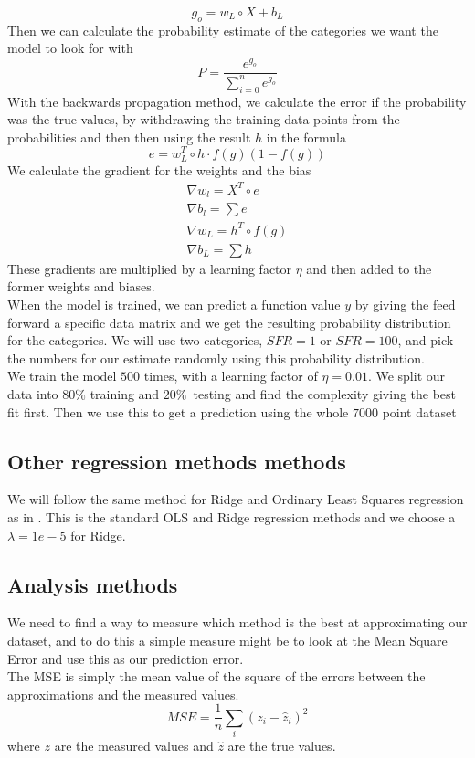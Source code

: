 \documentclass[11pt, A4paper, english]{article}
\begin{document}
\begin{multicols}{2}
				\begin{equation}
g_o = w_L \circ X + b_L
				\end{equation}
Then we can calculate the probability estimate of the categories we want the model to look for with
				\begin{equation}
P = \frac{e^{g_o}}{\sum_{i = 0}^{n} e^{g_o}}
				\end{equation}
With the backwards propagation method, we calculate the error if the probability was the true values, by withdrawing the training data points from the probabilities and then then using the result $h$ in the formula
				\begin{equation}
e = w_L^T \circ h \cdot f(g) (1 - f(g))
				\end{equation}
We calculate the gradient for the weights and the bias
				\begin{gather}
\nabla w_l = X^T \circ e \\
\nabla b_l = \sum e \\
\nabla w_L = h^T \circ f(g) \\
\nabla b_L = \sum h
				\end{gather}
These gradients are multiplied by a learning factor $\eta$ and then added to the former weights and biases. \\
When the model is trained, we can predict a function value $y$ by giving the feed forward a specific data matrix and we get the resulting probability distribution for the categories. We will use two categories, $SFR = 1$ or $SFR = 100$, and pick the numbers for our estimate randomly using this probability distribution. \\
We train the model $500$ times, with a learning factor of $\eta = 0.01$. We split our data into $80 \%$ training and $20 \%$ testing and find the complexity giving the best fit first. Then we use this to get a prediction using the whole $7000$ point dataset

				\subsection{Other regression methods methods}
We will follow the same method for Ridge and Ordinary Least Squares regression as in \cite{Project 1}. This is the standard OLS and Ridge regression methods and we choose a $\lambda = 1e-5$ for Ridge.

			\subsection{Analysis methods}
We need to find a way to measure which method is the best at approximating our dataset, and to do this a simple measure might be to look at the Mean Square Error and use this as our prediction error. \\
The MSE is simply the mean value of the square of the errors between the approximations and the measured values.
				\begin{equation}
MSE = \frac{1}{n} \sum_{i} \left( z_i - \hat{z}_i \right)^2
				\end{equation}
where $z$ are the measured values and $\hat{z}$ are the true values. \\


\end{multicols}
\end{document}
